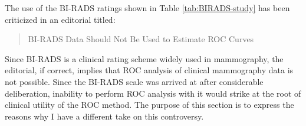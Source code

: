 \documentclass[
]{book}
\begin{document}
\begin{table}

\caption{\label{tab:BIRADS-study}The Barlow et al study: the ordering of the BI-RADS ratings in the first column correlates with cancer-rate in the last column.}
\centering
{}
\end{table}

The use of the BI-RADS ratings shown in Table \ref{tab:BIRADS-study} has been criticized \citep{RN2166} in an editorial titled:

\begin{quote}
BI-RADS Data Should Not Be Used to Estimate ROC Curves
\end{quote}

Since BI-RADS is a clinical rating scheme widely used in mammography, the editorial, if correct, implies that ROC analysis of clinical mammography data is not possible. Since the BI-RADS scale was arrived at after considerable deliberation, inability to perform ROC analysis with it would strike at the root of clinical utility of the ROC method. The purpose of this section is to express the reasons why I have a different take on this controversy.
\end{document}
